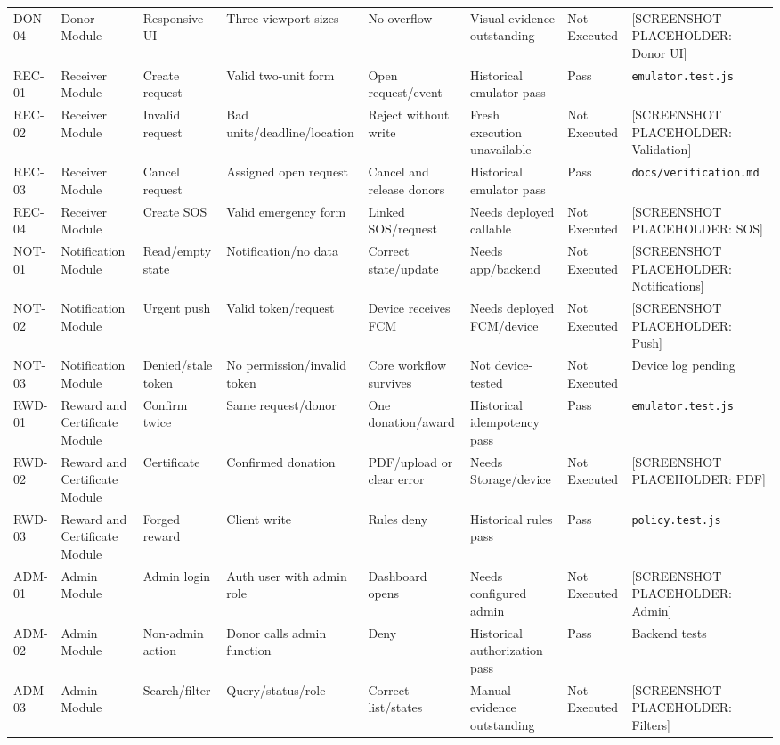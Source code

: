 \begin{landscape}
\begin{longtable}{p{1.2cm}p{2.2cm}p{3cm}p{2.5cm}p{3.3cm}p{3.2cm}p{1.6cm}p{3cm}}
DON-04&Donor Module&Responsive UI&Three viewport sizes&No overflow&Visual evidence outstanding&Not Executed&[SCREENSHOT PLACEHOLDER: Donor UI]\\
REC-01&Receiver Module&Create request&Valid two-unit form&Open request/event&Historical emulator pass&Pass&\texttt{emulator.test.js}\\
REC-02&Receiver Module&Invalid request&Bad units/deadline/location&Reject without write&Fresh execution unavailable&Not Executed&[SCREENSHOT PLACEHOLDER: Validation]\\
REC-03&Receiver Module&Cancel request&Assigned open request&Cancel and release donors&Historical emulator pass&Pass&\texttt{docs/verification.md}\\
REC-04&Receiver Module&Create SOS&Valid emergency form&Linked SOS/request&Needs deployed callable&Not Executed&[SCREENSHOT PLACEHOLDER: SOS]\\
NOT-01&Notification Module&Read/empty state&Notification/no data&Correct state/update&Needs app/backend&Not Executed&[SCREENSHOT PLACEHOLDER: Notifications]\\
NOT-02&Notification Module&Urgent push&Valid token/request&Device receives FCM&Needs deployed FCM/device&Not Executed&[SCREENSHOT PLACEHOLDER: Push]\\
NOT-03&Notification Module&Denied/stale token&No permission/invalid token&Core workflow survives&Not device-tested&Not Executed&Device log pending\\
RWD-01&Reward and Certificate Module&Confirm twice&Same request/donor&One donation/award&Historical idempotency pass&Pass&\texttt{emulator.test.js}\\
RWD-02&Reward and Certificate Module&Certificate&Confirmed donation&PDF/upload or clear error&Needs Storage/device&Not Executed&[SCREENSHOT PLACEHOLDER: PDF]\\
RWD-03&Reward and Certificate Module&Forged reward&Client write&Rules deny&Historical rules pass&Pass&\texttt{policy.test.js}\\
ADM-01&Admin Module&Admin login&Auth user with admin role&Dashboard opens&Needs configured admin&Not Executed&[SCREENSHOT PLACEHOLDER: Admin]\\
ADM-02&Admin Module&Non-admin action&Donor calls admin function&Deny&Historical authorization pass&Pass&Backend tests\\
ADM-03&Admin Module&Search/filter&Query/status/role&Correct list/states&Manual evidence outstanding&Not Executed&[SCREENSHOT PLACEHOLDER: Filters]\\

\end{longtable}
\end{landscape}
